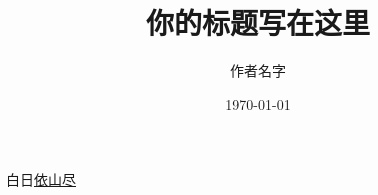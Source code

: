 \documentclass[UTF8]{ctexart}
\title{你的标题写在这里}
\author{作者名字}
\date{\today}
\begin{document}
	\tableofcontents %
	\maketitle  %

白日\underline{依山尽}
\end{document}
